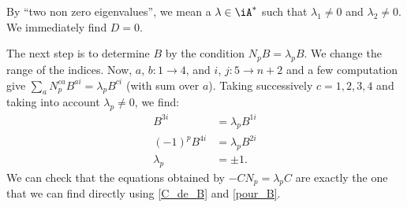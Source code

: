 By ``two non zero eigenvalues'', we mean a $\lambda\in\iA^*$ such that $\lambda_{1}\neq 0$ and $\lambda_{2}\neq 0$. We immediately find $D=0$.

The next step is to determine $B$ by the condition $N_pB=\lambda_p B$. We change the range of the indices. Now, $a$, $b:1\rightarrow 4$, and $i$, $j:5\rightarrow n+2$ and a few computation give $\sum_{a}^{}N_p^{ca}B^{ai}=\lambda_pB^{ci}$ (with sum over $a$). Taking successively $c=1,2,3,4$ and taking into account $\lambda_p\neq 0$, we find:
\begin{subequations}\label{pour_B}
\begin{align}
B^{3i}&=\lambda_pB^{1i} \\
(-1)^pB^{4i}&=\lambda_pB^{2i}\\
\lambda_p&=\pm 1.
\end{align}
\end{subequations}
We can check that the equations obtained by $-CN_p=\lambda_pC$ are exactly the one that we can find directly using \eqref{C_de_B} and \eqref{pour_B}.

